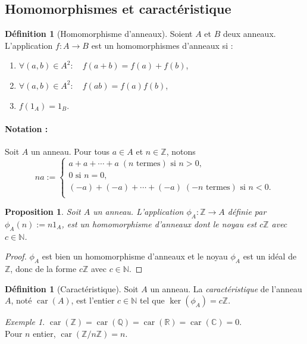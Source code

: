 \documentclass[a4paper, titlepage]{article}
\newtheorem{prop}[theo]{Proposition}
\theoremstyle{definition}
\newtheorem{defi}[theo]{Définition}
\theoremstyle{remark}
\newtheorem{exem}[theo]{Exemple}
\def\N{\mathbb N}
\def\Z{\mathbb Z}
\def\Q{\mathbb Q}
\def\R{\mathbb R}
\def\C{\mathbb C}
\def\car{\operatorname{car}}
\begin{document}
\subsection{Homomorphismes et caractéristique}

\begin{defi}[Homomorphisme d'anneaux]\label{defMorphismeAnneaux}
Soient $A$ et $B$ deux anneaux. L'application $f: A \rightarrow B$ est un homomorphismes d'anneaux si : \begin{enumerate}
\item $\forall (a,b) \in A^2: \quad f(a+b) = f(a) + f(b)$,
\item $\forall (a,b) \in A^2: \quad f(ab) = f(a)f(b)$,
\item $f(1_A) = 1_B$.
\end{enumerate}
\end{defi}

\paragraph*{Notation :}
Soit $A$ un anneau. Pour tous $a \in A$ et $n \in \Z$, notons
$$na := \left\{\begin{array}{l}
a + a + \cdots + a \; (n \text{ termes}) \text{ si } n > 0,\\
0 \text{ si } n = 0,\\
(-a) + (-a) + \cdots + (-a)\; (-n \text{ termes}) \text{ si } n < 0.\\
\end{array}\right.$$

\begin{prop}
Soit $A$ un anneau. L'application $\phi_A : \Z \rightarrow A$ définie par $\phi_A(n) := n1_A$, est un homomorphisme d'anneaux dont le noyau est $c\Z$ avec $c\in \N$.
\end{prop}

\begin{proof}
$\phi_A$ est bien un homomorphisme d'anneaux et le noyau $\phi_A$ est un idéal de $\Z$, donc de la forme $c\Z$ avec $c\in\N$.
\end{proof}

\begin{defi}[Caractéristique]
Soit $A$ un anneau. La \textit{caractéristique} de l'anneau $A$, noté $\car(A)$, est l'entier $c\in\N$ tel que $\ker(\phi_A) = c\Z$.
\end{defi}

\begin{exem}
$\car(\Z) = \car(\Q) =\car(\R) =\car(\C) = 0$. \\
Pour $n$ entier, $\car(\Z/n\Z) = n$.
\end{exem}
\end{document}
